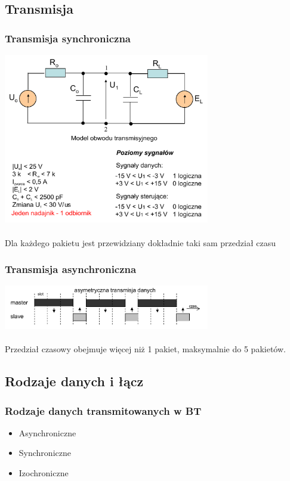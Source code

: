 \subsection{Transmisja}
\subsubsection{Transmisja synchroniczna}
\includegraphics[width=9cm]{./wyklady/Rysunek02.pdf}\\\\
Dla każdego pakietu jest przewidziany dokładnie taki sam przedział czasu
\subsubsection{Transmisja asynchroniczna}
\includegraphics[width=9cm]{./wyklady/Rysunek03.pdf}\\\\
Przedział czasowy obejmuje więcej niż 1 pakiet, maksymalnie do 5 pakietów.

\subsection{Rodzaje danych i łącz}
\subsubsection{Rodzaje danych transmitowanych w BT}
\begin{itemize}
	\item Asynchroniczne
	\item Synchroniczne
	\item Izochroniczne
\end{itemize}
